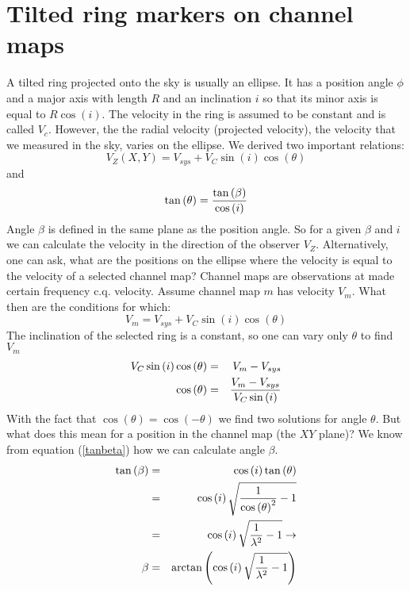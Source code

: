 \documentclass[11pt,a4paper]{article}
\newcommand{\sinb}[1]{\sin \left( #1 \right)}
\newcommand{\cosb}[1]{\cos \left( #1 \right)}
\newcommand{\tanb}[1]{\tan \left( #1 \right)}
\newcommand{\atanb}[1]{\arctan \left( #1 \right)}
\begin{document}
\section{Tilted ring markers on channel maps}
A tilted ring projected onto the sky is usually an ellipse. It has a position 
angle $\phi$ and a major axis with length $R$ and an inclination $i$ so that
its minor axis is equal to $R\cosb{i}$. The velocity in the ring is assumed to be constant
and is called $V_c$. However, the the radial velocity (projected velocity), 
the velocity that we measured in the sky, varies on the ellipse. 
We derived two important relations:
\begin{equation}
V_Z(X,Y) = V_{sys} + V_C \sinb{i} \cosb{\theta}
\end{equation}
and
\begin{equation}
\tanb{\theta} = {{\tanb{\beta}}\over{\cosb{i}}}
\label{tanbeta}
\end{equation}
Angle $\beta$ is defined in the same plane as the position angle.
So for a given $\beta$ and $i$ we can calculate the velocity in the direction of
the observer $V_Z$. Alternatively, one can ask, what are the positions on the ellipse
where the velocity is equal to the velocity of a selected channel map?
Channel maps are observations at made certain frequency c.q. velocity. 
Assume channel map $m$ has velocity $V_m$. What then are the conditions for which:
\begin{equation}
V_m = V_{sys} + V_C \sinb{i} \cosb{\theta}
\end{equation}
The inclination of the selected ring is a constant, so one can vary only $\theta$ 
to find $V_m$
\begin{eqnarray}
V_C \sinb{i} \cosb{\theta} &=& V_m - V_{sys} \nonumber \\
\cosb{\theta} &=& {{V_m - V_{sys}}\over{V_C \sinb{i}}}
\end{eqnarray}
With the fact that $\cosb{\theta}=\cosb{-\theta}$ we find two solutions for
angle $\theta$. But what does this mean for a position in the channel map (the $XY$ plane)? 
We know from equation (\ref{tanbeta}) how we can calculate angle $\beta$.
\begin{eqnarray}
\tanb{\beta} &=& \cosb{i} \tanb{\theta} \nonumber \\
& = & \cosb{i} \sqrt{{{1}\over{\cosb{\theta}^2}} - 1} \nonumber \\
& = & \cosb{i} \sqrt{{{1}\over{\lambda^2}} - 1} \rightarrow \nonumber \\
\beta &=& \atanb{\cosb{i} \sqrt{{{1}\over{\lambda^2}} - 1}}
\end{eqnarray}
\end{document}
